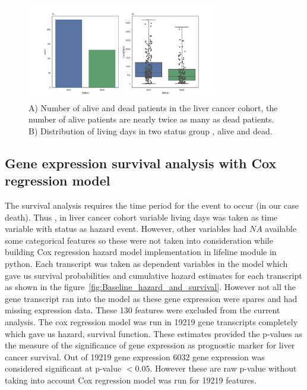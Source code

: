 \documentclass{article}
\begin{document}
\begin{figure}[tbh]
    \centering
      \includegraphics[width=0.75\textwidth]{Genderandstatus.png}
    \caption{A) Number of alive and dead patients in the liver cancer cohort, the number of alive patients are nearly twice as many as dead patients. B) Distribution of living days in two status group , alive and dead.\tiny}
    \label{fig:status_livingdays}
\end{figure}

	\subsection {Gene expression survival analysis with Cox regression model }
	
	The survival analysis requires the time period for the event to occur (in our case death). Thus , in liver cancer cohort variable living days was taken as time variable with status as hazard event. However, other variables had $NA$ available  some categorical features so these were not taken into consideration while building Cox regression hazard model implementation in lifeline module in python. Each transcript was taken as dependent variables in the model which gave us survival probabilities and cumulative hazard estimates for each transcript as shown in the figure~\ref{fig:Baseline_hazard_and_survival}. However not all the gene transcript ran into the model as these gene expression were spares and had missing expression data. These 130 features were excluded from the current analysis.  The cox regression model was run in 19219 gene transcripts completely which gave us hazard, survival function. These estimates provided the p-values as the measure of the significance of gene expression as prognostic marker for  liver cancer survival. Out of 19219 gene expression $6032$ gene expression was considered significant at p-value $< 0.05$. However these are raw p-value without taking into account Cox regression model was run for 19219 features.   
	
\end{document}
